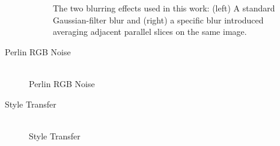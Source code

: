 \begin{description}
\begin{figure}
\begin{subfigure}[t]{0.2\textwidth}
             \caption{}
             \label{fig:av_blur}
        \end{subfigure}
        \caption{The two blurring effects used in this work: (left) A standard Gaussian-filter blur and (right) a specific blur introduced averaging adjacent parallel slices on the same image.}
        \label{fig:blur_effect}
    \end{figure}

    \item [Perlin RGB Noise] \hfill \\
    Perlin RGB Noise

    \item [Style Transfer] \hfill \\
    Style Transfer

\end{description}


%
%
